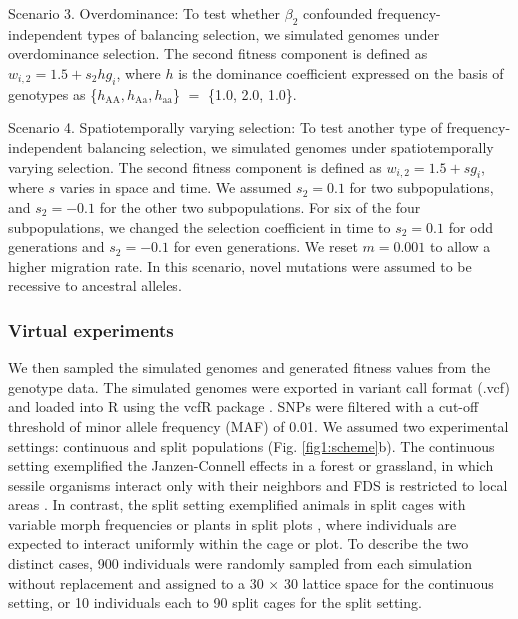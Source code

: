 \documentclass[12pt,]{article}
\begin{document}
Scenario 3. Overdominance: To test whether $\beta_2$ confounded frequency-independent types of balancing selection, we simulated genomes under overdominance selection. The second fitness component is defined as $w_{i,2} = 1.5 + s_2hg_i$, where $h$ is the dominance coefficient expressed on the basis of genotypes as \{$h_\mathrm{AA}, h_\mathrm{Aa}, h_\mathrm{aa}$\} $=$ \{1.0, 2.0, 1.0\}.

Scenario 4. Spatiotemporally varying selection: To test another type of frequency-independent balancing selection, we simulated genomes under spatiotemporally varying selection. The second fitness component is defined as $w_{i,2} = 1.5 + s g_i$, where $s$ varies in space and time. We assumed $s_2=0.1$ for two subpopulations, and $s_2=-0.1$ for the other two subpopulations. For six of the four subpopulations, we changed the selection coefficient in time to $s_2=0.1$ for odd generations and $s_2=-0.1$ for even generations. We reset $m=0.001$ to allow a higher migration rate. In this scenario, novel mutations were assumed to be recessive to ancestral alleles.

\subsubsection{Virtual experiments}
We then sampled the simulated genomes and generated fitness values from the genotype data. The simulated genomes were exported in variant call format (.vcf) and loaded into R using the vcfR package \citep{knaus2017vcfr}. SNPs were filtered with a cut-off threshold of minor allele frequency (MAF) of 0.01. We assumed two experimental settings: continuous and split populations (Fig. \ref{fig1:scheme}b). The continuous setting exemplified the Janzen-Connell effects in a forest or grassland, in which sessile organisms interact only with their neighbors and FDS is restricted to local areas \citep{antonovics1984experimental, browne2016frequency}. In contrast, the split setting exemplified animals in split cages with variable morph frequencies \citep{cosmidis1999rarer, fitzpatrick2007maintaining} or plants in split plots \citep{sato2017herbivore}, where individuals are expected to interact uniformly within the cage or plot. To describe the two distinct cases, 900 individuals were randomly sampled from each simulation without replacement and assigned to a 30 $\times$ 30 lattice space for the continuous setting, or 10 individuals each to 90 split cages for the split setting.
\end{document}
